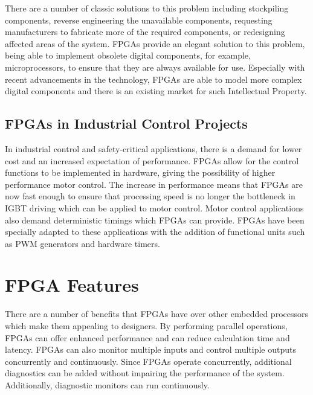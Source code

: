 There are a number of classic solutions to this problem including stockpiling components, reverse engineering the unavailable components, requesting manufacturers to fabricate more of the required components, or redesigning affected areas of the system\cite{Guzman-Miranda}. FPGAs provide an elegant solution to this problem, being able to implement obsolete digital components, for example, microprocessors, to ensure that they are always available for use\cite{Guzman-Miranda, Malinowski}. Especially with recent advancements in the technology, FPGAs are able to model more complex digital components and there is an existing market for such Intellectual Property\cite{Guzman-Miranda}.

\subsection{FPGAs in Industrial Control Projects}

In industrial control and safety-critical applications, there is a demand for lower cost and an increased expectation of performance\cite{MonmassonFPGADesignMethodology, SalewskiFaultHandling}. 
FPGAs allow for the control functions to be implemented in hardware, giving the possibility of higher performance motor control\cite{jabeen}. The increase in performance means that FPGAs are now fast enough to ensure that processing speed is no longer the bottleneck in IGBT driving which can be applied to motor control\cite{MonmassonDesign}. Motor control applications also demand deterministic timings which FPGAs can provide\cite{Dubey, al-mahmood}. FPGAs have been specially adapted to these applications with the addition of functional units such as PWM generators and hardware timers\cite{deCastro}.




\section{FPGA Features}

There are a number of benefits that FPGAs have over other embedded processors which make them appealing to designers. By performing parallel operations, FPGAs can offer enhanced performance\cite{Dubey,Foster,Al-Dhaher,Conmy,MonmassonFPGABasedControllers,MonmassonFPGADesignMethodology, deCastro} and can reduce calculation time and latency\cite{Rodriguez,Naouar,MonmassonFPGADesignMethodology}. FPGAs can also monitor multiple inputs and control multiple outputs concurrently and continuously\cite{SalewskiSystematic, deCastro, Zhang}. 
Since FPGAs operate concurrently, additional diagnostics can be added without impairing the performance of the system\cite{Dubey}. Additionally, diagnostic monitors can run continuously\cite{Dubey}.

